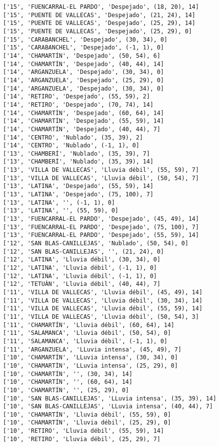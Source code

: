 \documentclass[11pt]{article}
\begin{document}
\begin{Verbatim}[commandchars=\\\{\}]
['15', 'FUENCARRAL-EL PARDO', 'Despejado', (18, 20), 14]
['15', 'PUENTE DE VALLECAS', 'Despejado', (21, 24), 14]
['15', 'PUENTE DE VALLECAS', 'Despejado', (25, 29), 14]
['15', 'PUENTE DE VALLECAS', 'Despejado', (25, 29), 0]
['15', 'CARABANCHEL', 'Despejado', (30, 34), 0]
['15', 'CARABANCHEL', 'Despejado', (-1, 1), 0]
['14', 'CHAMARTÍN', 'Despejado', (50, 54), 6]
['14', 'CHAMARTÍN', 'Despejado', (40, 44), 14]
['14', 'ARGANZUELA', 'Despejado', (30, 34), 0]
['14', 'ARGANZUELA', 'Despejado', (25, 29), 0]
['14', 'ARGANZUELA', 'Despejado', (30, 34), 0]
['14', 'RETIRO', 'Despejado', (55, 59), 2]
['14', 'RETIRO', 'Despejado', (70, 74), 14]
['14', 'CHAMARTÍN', 'Despejado', (60, 64), 14]
['14', 'CHAMARTÍN', 'Despejado', (55, 59), 14]
['14', 'CHAMARTÍN', 'Despejado', (40, 44), 7]
['14', 'CENTRO', 'Nublado', (35, 39), 2]
['14', 'CENTRO', 'Nublado', (-1, 1), 0]
['13', 'CHAMBERÍ', 'Nublado', (35, 39), 7]
['13', 'CHAMBERÍ', 'Nublado', (35, 39), 14]
['13', 'VILLA DE VALLECAS', 'Lluvia débil', (55, 59), 7]
['13', 'VILLA DE VALLECAS', 'Lluvia débil', (50, 54), 7]
['13', 'LATINA', 'Despejado', (55, 59), 14]
['13', 'LATINA', 'Despejado', (75, 100), 7]
['13', 'LATINA', '', (-1, 1), 0]
['13', 'LATINA', '', (55, 59), 0]
['13', 'FUENCARRAL-EL PARDO', 'Despejado', (45, 49), 14]
['13', 'FUENCARRAL-EL PARDO', 'Despejado', (75, 100), 7]
['13', 'FUENCARRAL-EL PARDO', 'Despejado', (55, 59), 14]
['12', 'SAN BLAS-CANILLEJAS', 'Nublado', (50, 54), 0]
['12', 'SAN BLAS-CANILLEJAS', '', (21, 24), 0]
['12', 'LATINA', 'Lluvia débil', (30, 34), 0]
['12', 'LATINA', 'Lluvia débil', (-1, 1), 0]
['12', 'LATINA', 'Lluvia débil', (-1, 1), 0]
['12', 'TETUÁN', 'Lluvia débil', (40, 44), 7]
['11', 'VILLA DE VALLECAS', 'Lluvia débil', (45, 49), 14]
['11', 'VILLA DE VALLECAS', 'Lluvia débil', (30, 34), 14]
['11', 'VILLA DE VALLECAS', 'Lluvia débil', (55, 59), 14]
['11', 'VILLA DE VALLECAS', 'Lluvia débil', (50, 54), 3]
['11', 'CHAMARTÍN', 'Lluvia débil', (60, 64), 14]
['11', 'SALAMANCA', 'Lluvia débil', (50, 54), 0]
['11', 'SALAMANCA', 'Lluvia débil', (-1, 1), 0]
['11', 'ARGANZUELA', 'LLuvia intensa', (45, 49), 7]
['10', 'CHAMARTÍN', 'LLuvia intensa', (30, 34), 0]
['10', 'CHAMARTÍN', 'LLuvia intensa', (25, 29), 0]
['10', 'CHAMARTÍN', '', (30, 34), 14]
['10', 'CHAMARTÍN', '', (60, 64), 14]
['10', 'CHAMARTÍN', '', (25, 29), 0]
['10', 'SAN BLAS-CANILLEJAS', 'LLuvia intensa', (35, 39), 14]
['10', 'SAN BLAS-CANILLEJAS', 'LLuvia intensa', (40, 44), 7]
['10', 'CHAMARTÍN', 'Lluvia débil', (55, 59), 0]
['10', 'CHAMARTÍN', 'Lluvia débil', (25, 29), 0]
['10', 'RETIRO', 'Lluvia débil', (55, 59), 14]
['10', 'RETIRO', 'Lluvia débil', (25, 29), 7]

\end{Verbatim}
\end{document}
